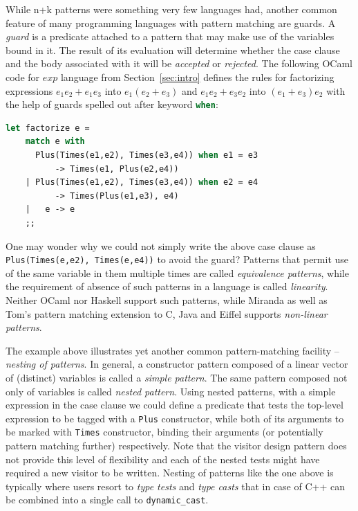 \documentclass[preprint]{sigplanconf}
\makeatletter
\DeclareRobustCommand{\code}[1]{{\lstinline[breaklines=false,escapechar=@]{#1}}}
\DeclareRobustCommand{\codeocaml}[1]{{\lstinline[breaklines=false,language=Caml]{#1}}}
\makeatother
\begin{document}
While n+k patterns were something very few languages had, another common feature of 
many programming languages with pattern matching are guards. A \emph{guard} 
is a predicate attached to a pattern that may make use of the variables bound in 
it. The result of its evaluation will determine whether the case clause and the 
body associated with it will be \emph{accepted} or \emph{rejected}. The 
following OCaml code for $exp$ language from Section~\ref{sec:intro} defines the 
rules for factorizing expressions $e_1e_2+e_1e_3$ into $e_1(e_2+e_3)$ and 
$e_1e_2+e_3e_2$ into $(e_1+e_3)e_2$ with the help of guards spelled out after 
keyword \codeocaml{when}:

\begin{lstlisting}[language=Caml,keepspaces,columns=flexible]
let factorize e =
    match e with
      Plus(Times(e1,e2), Times(e3,e4)) when e1 = e3 
          -> Times(e1, Plus(e2,e4))
    | Plus(Times(e1,e2), Times(e3,e4)) when e2 = e4 
          -> Times(Plus(e1,e3), e4)
    |   e -> e
    ;;
\end{lstlisting}

\noindent
One may wonder why we could not simply write the above case clause as 
\codeocaml{Plus(Times(e,e2), Times(e,e4))} to avoid the guard? Patterns that 
permit use of the same variable in them multiple times are called 
\emph{equivalence patterns}, while the requirement of absence of such patterns 
in a language is called \emph{linearity}. Neither OCaml nor Haskell support such 
patterns, while Miranda\cite{Miranda85} as well as Tom's pattern matching 
extension to C, Java and Eiffel\cite{Moreau:2003} supports \emph{non-linear 
patterns}.

The example above illustrates yet another common pattern-matching facility -- 
\emph{nesting of patterns}. In general, a constructor pattern composed of a 
linear vector of (distinct) variables is called a \emph{simple pattern}. The 
same pattern composed not only of variables is called \emph{nested pattern}.
Using nested patterns, with a simple expression in the case clause we could
define a predicate that tests the top-level expression to be tagged with a
\codeocaml{Plus} constructor, while both of its arguments to be marked with 
\codeocaml{Times} constructor, binding their arguments (or potentially pattern 
matching further) respectively. Note that the visitor design pattern does not 
provide this level of flexibility and each of the nested tests might have 
required a new visitor to be written. Nesting of patterns like the one above is 
typically where users resort to \emph{type tests} and \emph{type casts} that in 
case of C++ can be combined into a single call to \code{dynamic_cast}.
\end{document}

